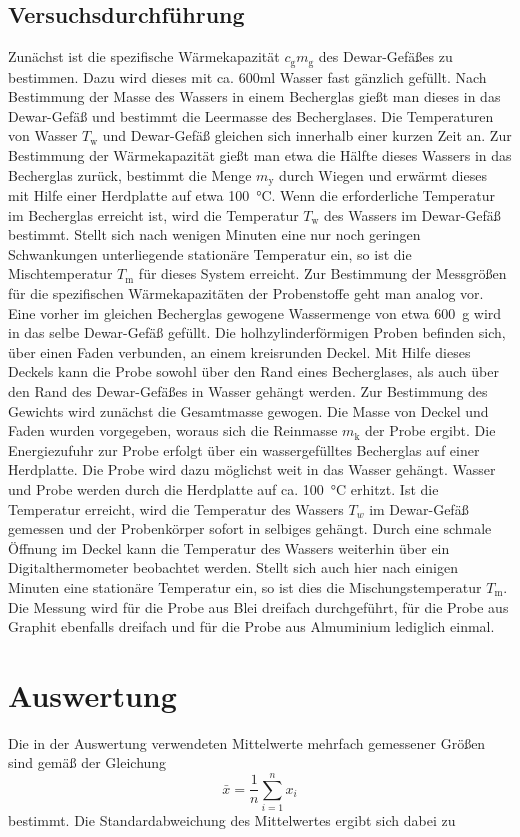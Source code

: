 \documentclass[
  bibliography=totoc,     %
  captions=tableheading,  %
  titlepage=firstiscover, %
]{scrartcl}
\begin{document}
\subsection{Versuchsdurchführung}
Zunächst ist die spezifische Wärmekapazität $c_{\mathup{g}}m_{\mathup{g}}$ des
Dewar-Gefäßes zu bestimmen.
Dazu wird dieses mit ca. 600ml Wasser fast gänzlich gefüllt. Nach Bestimmung der
Masse des Wassers in einem Becherglas gießt man dieses in das Dewar-Gefäß und
bestimmt die Leermasse des Becherglases. Die Temperaturen von Wasser
$T_{\mathup{w}}$ und Dewar-Gefäß gleichen sich innerhalb einer kurzen Zeit an.
Zur Bestimmung der Wärmekapazität gießt man etwa die Hälfte dieses Wassers in
das Becherglas zurück, bestimmt die Menge $m_{\mathup{y}}$ durch Wiegen und
erwärmt dieses mit Hilfe einer Herdplatte auf etwa \SI{100}{\celsius}.
Wenn die erforderliche Temperatur im Becherglas erreicht ist, wird die
Temperatur $T_{\mathup{w}}$ des Wassers im Dewar-Gefäß bestimmt. Stellt sich nach
wenigen Minuten eine nur noch geringen Schwankungen unterliegende stationäre
Temperatur ein, so ist die Mischtemperatur $T_{\mathup{m}}$ für dieses System
erreicht.
Zur Bestimmung der Messgrößen für die spezifischen Wärmekapazitäten der
Probenstoffe geht man analog vor. Eine vorher im gleichen Becherglas gewogene
Wassermenge von etwa \SI{600}{\gram} wird in das selbe Dewar-Gefäß gefüllt. Die
holhzylinderförmigen Proben befinden sich, über einen Faden verbunden, an einem
kreisrunden Deckel. Mit Hilfe dieses Deckels kann die Probe sowohl über den Rand
eines Becherglases, als auch über den Rand des Dewar-Gefäßes in Wasser gehängt
werden. Zur Bestimmung des Gewichts wird zunächst die Gesamtmasse gewogen. Die
Masse von Deckel und Faden wurden vorgegeben, woraus sich die Reinmasse
$m_{\mathup{k}}$ der Probe ergibt. Die Energiezufuhr zur Probe erfolgt über ein
wassergefülltes Becherglas auf einer Herdplatte. Die Probe wird dazu möglichst
weit in das Wasser gehängt. Wasser und Probe werden durch die Herdplatte auf ca.
\SI{100}{\celsius} erhitzt. Ist die Temperatur erreicht, wird die Temperatur des
Wassers $T_w$ im Dewar-Gefäß gemessen und der Probenkörper sofort in selbiges
gehängt. Durch eine schmale Öffnung im Deckel kann die Temperatur des Wassers
weiterhin über ein Digitalthermometer beobachtet werden. Stellt sich auch hier
nach einigen Minuten eine stationäre Temperatur ein, so ist dies die
Mischungstemperatur $T_{\mathup{m}}$. Die Messung wird für die Probe aus Blei
dreifach durchgeführt, für die Probe aus Graphit ebenfalls dreifach und für die
Probe aus Almuminium lediglich einmal.
\section{Auswertung}
\label{sec:auswertung}
Die in der Auswertung verwendeten Mittelwerte mehrfach gemessener Größen sind gemäß der
Gleichung
\begin{equation}
    \bar{x}=\frac{1}{n}\sum_{i=1}^n x_i
\end{equation}
bestimmt. Die Standardabweichung des Mittelwertes ergibt sich dabei zu
\end{document}

